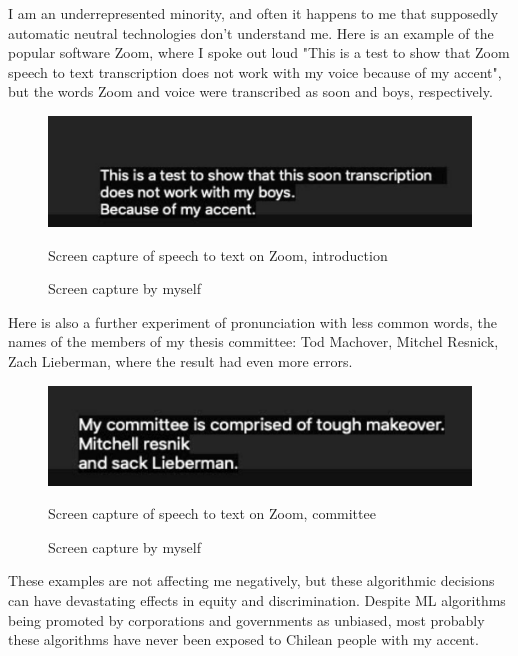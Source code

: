 I am an underrepresented minority, and often it happens to me that supposedly automatic neutral technologies don't understand me. Here is an example of the popular software Zoom, where I spoke out loud "This is a test to show that Zoom speech to text transcription does not work with my voice because of my accent", but the words Zoom and voice were transcribed as soon and boys, respectively.

\begin{figure}[ht]
  \centering
  \includegraphics[width=0.75\linewidth,height=0.25\textheight,keepaspectratio]{images/zoom-introduction.jpg}
  \caption{Screen capture of speech to text on Zoom, introduction}
  \caption*{Screen capture by myself}
  \label{fig:zoom-voice}
\end{figure}

Here is also a further experiment of pronunciation with less common words, the names of the members of my thesis committee: Tod Machover, Mitchel Resnick, Zach Lieberman, where the result had even more errors.

\begin{figure}[ht]
  \centering
  \includegraphics[width=0.75\linewidth,height=0.25\textheight,keepaspectratio]{images/zoom-committee.jpg}
  \caption{Screen capture of speech to text on Zoom, committee}
  \caption*{Screen capture by myself}
  \label{fig:zoom-committee}
\end{figure}

These examples are not affecting me negatively, but these algorithmic decisions can have devastating effects in equity and discrimination.  Despite \acrshort{ML} algorithms being promoted by corporations and governments as unbiased, most probably these algorithms have never been exposed to Chilean people with my accent.

